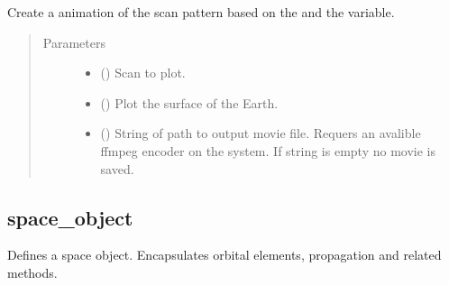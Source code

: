 \documentclass[letterpaper,10pt,english]{sphinxmanual}
\begin{document}

\begin{fulllineitems}
\label{\detokenize{modules/radar_scans:radar_scans.plot_radar_scan_movie}}
Create a animation of the scan pattern based on the  and the  variable.
\begin{quote}\begin{description}
\item[{Parameters}] \leavevmode\begin{itemize}
\item {} 
 ({\hyperref[\detokenize{modules/radar_scans:radar_scans.RadarScan}]{}}) \textendash{} Scan to plot.

\item {} 
 () \textendash{} Plot the surface of the Earth.

\item {} 
 () \textendash{} String of path to output movie file. Requers an avalible ffmpeg encoder on the system. If string is empty no movie is saved.

\end{itemize}

\end{description}\end{quote}

\end{fulllineitems}



\subsection{space\_object}
\label{\detokenize{modules/space_object:module-space_object}}\label{\detokenize{modules/space_object:space-object}}\label{\detokenize{modules/space_object::doc}}
Defines a space object. Encapsulates orbital elements, propagation and related methods.
\end{document}
